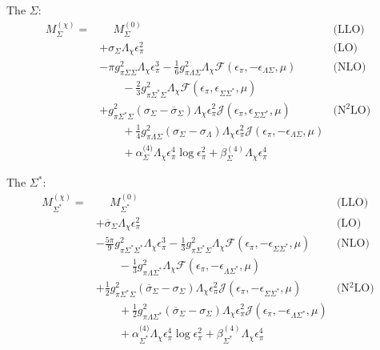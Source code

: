 \documentclass[12pt,tightenlines, raggedbottom, prd, notitlepage]{revtex4-1}
\begin{document}
The $\Sigma$:
\begin{align*}
M_\Sigma^{(\chi)} = &\phantom{+} M_\Sigma^{(0)} & \text{(LLO)} \\
&+ \sigma_\Sigma \Lambda_\chi \epsilon_\pi^2 & \text{(LO)} \\
&- \pi g_{\pi\Sigma\Sigma}^2 \Lambda_{\chi} \epsilon_\pi^3 
- \frac{1}{6} g_{\pi\Lambda\Sigma}^2 \Lambda_{\chi} \mathcal{F}(\epsilon_\pi, -\epsilon_{\Lambda\Sigma}, \mu) &\text{(NLO)} \\
&\qquad - \frac{2}{3} g_{\pi\Sigma^*\Sigma}^2 \Lambda_{\chi} \mathcal{F}(\epsilon_\pi, \epsilon_{\Sigma\Sigma^*}, \mu)  \\
&+ g_{\pi\Sigma^*\Sigma}^2 (\sigma_\Sigma - \overline{\sigma}_\Sigma) \Lambda_\chi \epsilon_\pi^2 
\mathcal{J} (\epsilon_\pi, \epsilon_{\Sigma\Sigma^*}, \mu) &\text{(N$^2$LO)} \\
&\qquad + \frac{1}{4} g_{\pi\Lambda\Sigma}^2 (\sigma_\Sigma - \sigma_\Lambda) \Lambda_\chi \epsilon_\pi^2 \mathcal{J} (\epsilon_\pi, -\epsilon_{\Lambda\Sigma}, \mu) \\
&\qquad + \alpha_\Sigma^\text{(4)} \Lambda_{\chi} \epsilon_\pi^4 \log{\epsilon_\pi^2} + \beta_{\Sigma}^{(4)} \Lambda_\chi \epsilon_\pi^4
\end{align*}

The $\Sigma^*$:
\begin{align*}
M_{\Sigma^*}^{(\chi)} = &\phantom{+}  M_{\Sigma^*}^{(0)} & \text{(LLO)} \\
&+ \overline{\sigma}_{\Sigma} \Lambda_\chi \epsilon_\pi^2 & \text{(LO)} \\
&- \frac{5\pi}{9} g_{\pi\Sigma^*\Sigma^*}^2 \Lambda_{\chi} \epsilon_\pi^3 
- \frac{1}{3} g_{\pi\Sigma^*\Sigma}^2 \Lambda_{\chi} \mathcal{F}(\epsilon_\pi, -\epsilon_{\Sigma\Sigma^*}, \mu) &\text{(NLO)} \\
&\qquad - \frac{1}{3} g_{\pi\Lambda\Sigma^*}^2 \Lambda_{\chi} \mathcal{F}(\epsilon_\pi, -\epsilon_{\Lambda\Sigma^*}, \mu)  \\
&+ \frac{1}{2} g_{\pi\Sigma^*\Sigma}^2 (\overline{\sigma}_\Sigma -\sigma_\Sigma) \Lambda_\chi \epsilon_\pi^2 \mathcal{J} (\epsilon_\pi, -\epsilon_{\Sigma\Sigma^*}, \mu) &\text{(N$^2$LO)} \\
&\qquad + \frac{1}{2} g_{\pi\Lambda\Sigma^*}^2 (\overline{\sigma}_\Sigma -\sigma_\Sigma) \Lambda_\chi \epsilon_\pi^2 \mathcal{J} (\epsilon_\pi, -\epsilon_{\Lambda\Sigma^*}, \mu) \\
&\qquad + \alpha_{\Sigma^*}^\text{(4)} \Lambda_{\chi} \epsilon_\pi^4 \log{\epsilon_\pi^2} + \beta_{\Sigma^*}^{(4)} \Lambda_\chi \epsilon_\pi^4
\end{align*}
\end{document}
